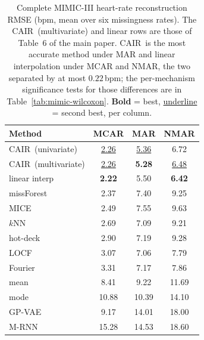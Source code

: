 \begin{table}[t]
  \centering
  {\small
  \setlength{\tabcolsep}{6pt}
  \begin{tabular}{lccc}
    \toprule
    Method & MCAR & MAR & NMAR \\
    \midrule
    CAIR\ (univariate)   & \underline{2.26} & \underline{5.36} & 6.72 \\
    CAIR\ (multivariate) & \underline{2.26} & \textbf{5.28} & \underline{6.48} \\
    linear interp   & \textbf{2.22} & 5.50 & \textbf{6.42} \\
    missForest      & 2.37 & 7.40 & 9.25 \\
    MICE            & 2.49 & 7.55 & 9.63 \\
    $k$NN           & 2.69 & 7.09 & 9.21 \\
    hot-deck        & 2.90 & 7.19 & 9.28 \\
    LOCF            & 3.07 & 7.06 & 7.79 \\
    Fourier         & 3.31 & 7.17 & 7.86 \\
    mean            & 8.41 & 9.22 & 11.69 \\
    mode            & 10.88 & 10.39 & 14.10 \\
    GP-VAE          & 9.17 & 14.01 & 18.00 \\
    M-RNN           & 15.28 & 14.53 & 18.60 \\
    \bottomrule
  \end{tabular}}
  \caption{Complete MIMIC-III heart-rate reconstruction RMSE (bpm, mean over six
  missingness rates). The CAIR\ (multivariate) and linear rows are those of
  Table~6 of the main paper. CAIR\ is the most accurate method under MAR and
  linear interpolation under MCAR and NMAR, the two separated by at most
  $0.22$\,bpm; the per-mechanism significance tests for those differences are in
  Table~\ref{tab:mimic-wilcoxon}.
  \textbf{Bold} = best, \underline{underline} = second best, per column.}
  \label{tab:mimic-hr-full}
\end{table}

